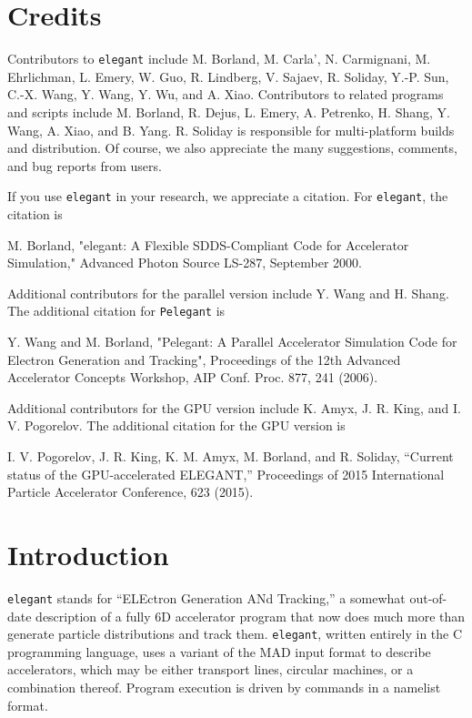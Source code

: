 \documentclass[11pt]{article}
\begin{document}
\section{Credits}

Contributors to {\tt elegant} include M. Borland, M. Carla', N. Carmignani, M. Ehrlichman, L. Emery, W. Guo, R. Lindberg,
V. Sajaev, R. Soliday, Y.-P. Sun, C.-X. Wang, Y. Wang, Y. Wu, and A. Xiao.
Contributors to related programs and scripts include M. Borland, R. Dejus, L. Emery, A. Petrenko, H. Shang, Y. Wang, 
A. Xiao, and B. Yang.
R. Soliday is responsible for multi-platform builds and distribution.
Of course, we also appreciate the many suggestions, comments, and bug reports from users.

If you use {\tt elegant} in your research, we appreciate a citation. For {\tt elegant}, the citation is
\begin{flushleft}
M. Borland, "elegant: A Flexible SDDS-Compliant Code for Accelerator Simulation," Advanced Photon Source LS-287, September 2000.
\end{flushleft}

Additional contributors for the parallel version include Y. Wang and H. Shang.
The additional citation for {\tt Pelegant} is
\begin{flushleft}
Y. Wang and M. Borland, "Pelegant: A Parallel Accelerator Simulation Code for Electron Generation and Tracking", Proceedings of the 12th Advanced Accelerator
Concepts Workshop, AIP Conf. Proc. 877, 241 (2006).
\end{flushleft}

Additional contributors for the GPU version include K. Amyx, J. R. King, and I. V. Pogorelov. 
The additional citation for the GPU version is
\begin{flushleft}
I. V. Pogorelov, J. R. King, K. M. Amyx, M. Borland, and R. Soliday, ``Current status of the GPU-accelerated ELEGANT,''
Proceedings of 2015 International Particle Accelerator Conference, 623 (2015).
\end{flushleft}

\section{Introduction}

{\tt elegant} stands for ``ELEctron Generation ANd Tracking,'' a
somewhat out-of-date description of a fully 6D accelerator program
that now does much more than generate particle distributions and track
them.  {\tt elegant}, written entirely in the C programming
language\cite{Kernighan}, uses a variant of the MAD\cite{MAD} input
format to describe accelerators, which may be either transport lines,
circular machines, or a combination thereof.  Program execution is
driven by commands in a namelist format.
\end{document}
